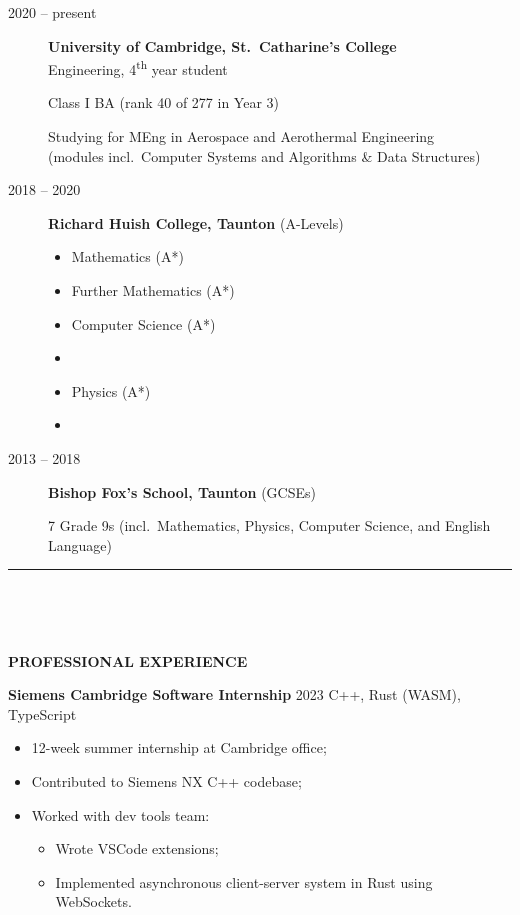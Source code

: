 \documentclass[
  11pt,
  a4paper,
]{article}
\providecommand{\tightlist}{%
  \setlength{\itemsep}{0pt}\setlength{\parskip}{0pt}}
\newcommand{\itemspace}{0.8ex}
\newcommand{\ruledheader}[2]{%
\begingroup
\setlength{\fboxsep}{0pt}%
\colorbox{#1}{%
\parbox[b][1.2ex][t]{35mm}{\begin{tiny}\ \end{tiny}}}%
\parbox[b][1.2ex][t]{5mm}{\begin{tiny}\ \end{tiny}}%
\uppercase{\textbf{#2}}
\endgroup}
\begin{document}
\begin{description}
\item[2020 – present]
\textbf{University of Cambridge, St.~Catharine’s College}\\
Engineering, 4\textsuperscript{th} year student

Class I BA (rank 40 of 277 in Year 3)

Studying for MEng in Aerospace and Aerothermal Engineering\\
(modules incl.~Computer Systems and Algorithms \& Data Structures)
\item[2018 – 2020]
\textbf{Richard Huish College, Taunton} (A-Levels)

\begingroup
\begin{multicols}{3}

\begin{itemize}
\tightlist
\item
  Mathematics (A*)
\item
  Further Mathematics (A*)
\item
  Computer Science (A*)
\item
\item
  Physics (A*)
\item
\end{itemize}

\end{multicols}
\vspace{-\parskip}\endgroup
\item[2013 – 2018]
\textbf{Bishop Fox’s School, Taunton} (GCSEs)

7 Grade 9s (incl.~Mathematics, Physics, Computer Science, and English
Language)
\end{description}

\begin{Large}

\vspace{-1.5ex}\rule{\textwidth}{0.8pt}\vspace{2ex}

\ruledheader{cyan!50!teal}{Professional experience}\end{Large}

\vspace{\itemspace}

\textbf{Siemens Cambridge Software Internship} \textbar{} 2023
\textbar{} C++, Rust (WASM), TypeScript

\begin{itemize}
\tightlist
\item
  12-week summer internship at Cambridge office;
\item
  Contributed to Siemens NX C++ codebase;
\item
  Worked with dev tools team:

  \begin{itemize}
  \tightlist
  \item
    Wrote VSCode extensions;
  \item
    Implemented asynchronous client-server system in Rust using
    WebSockets.
  \end{itemize}
\end{itemize}
\end{document}
